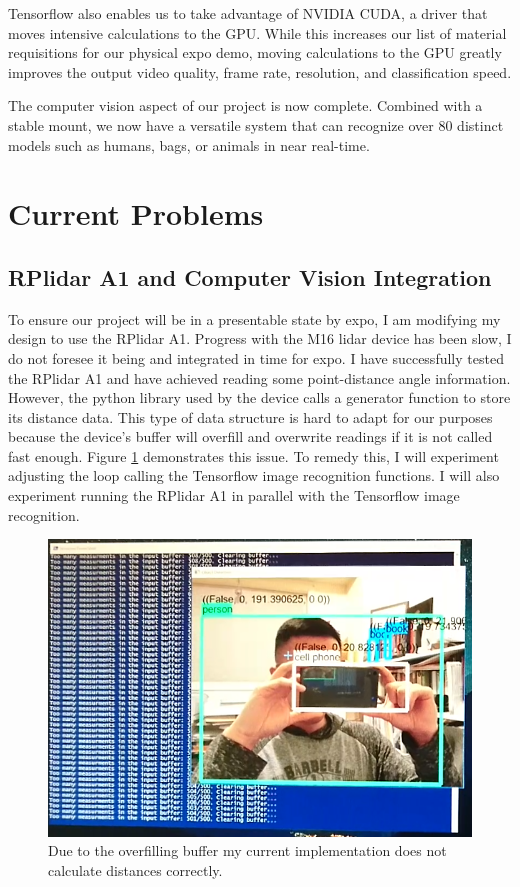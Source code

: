 \documentclass[onecolumn, draftclsnofoot,10pt, compsoc]{IEEEtran}
\makeatletter
\newcommand\captionof[1]{\def\@captype{#1}\caption}
\makeatother
\begin{document}
\begin{singlespace}
			Tensorflow also enables us to take advantage of NVIDIA CUDA, a driver that moves intensive calculations to the GPU.
			While this increases our list of material requisitions for our physical expo demo, moving calculations to the GPU greatly improves the output video quality, frame rate, resolution, and classification speed. \cite{nvidia}
			

			The computer vision aspect of our project is now complete.
			Combined with a stable mount, we now have a versatile system that can recognize over 80 distinct models such as humans, bags, or animals in near real-time.
			

	\section{Current Problems}
		\subsection{RPlidar A1 and Computer Vision Integration}
			To ensure our project will be in a presentable state by expo, I am modifying my design to use the RPlidar A1.
			Progress with the M16 lidar device has been slow, I do not foresee it being and integrated in time for expo.
			I have successfully tested the RPlidar A1 and have achieved reading some point-distance angle information.
			However, the python library used by the device calls a generator function to store its distance data.
			This type of data structure is hard to adapt for our purposes because the device's buffer will overfill and overwrite readings if it is not called fast enough.
			Figure \ref{reading} demonstrates this issue.
			To remedy this, I will experiment adjusting the loop calling the Tensorflow image recognition functions.
			I will also experiment running the RPlidar A1 in parallel with the Tensorflow image recognition.

			\begin{figure}[H]
			\includegraphics[scale=0.45]{reading.PNG}
			\captionof{figure}{Due to the overfilling buffer my current implementation does not calculate distances correctly.}
			\label{reading}
			\end{figure}



\end{singlespace}
\end{document}
